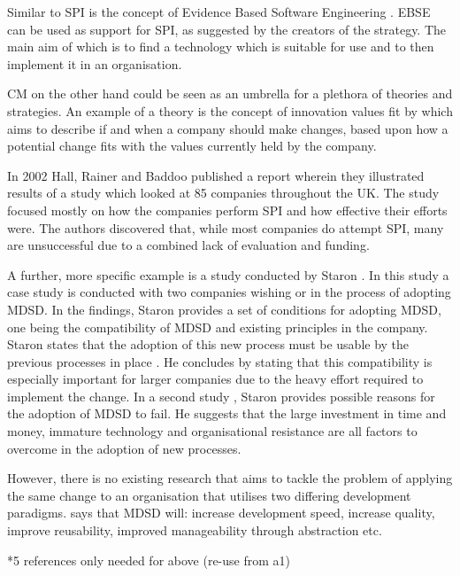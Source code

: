 \documentclass[10pt,twocolumn]{article}
\begin{document}
Similar to SPI is the concept of Evidence Based Software Engineering \cite{dyba2005evidence}. EBSE can be used as support for SPI, as suggested by the creators of the strategy. The main aim of which is to find a technology which is suitable for use and to then implement it in an organisation.

CM on the other hand could be seen as an umbrella for a plethora of theories and strategies. An example of a theory is the concept of innovation values fit by \cite{klein1996challenge} which aims to describe if and when a company should make changes, based upon how a potential change fits with the values currently held by the company.

In 2002 Hall, Rainer and Baddoo \cite{hall2002implementing} published a report wherein they illustrated results of a study which looked at 85 companies throughout the UK. The study focused mostly on how the companies perform SPI and how effective their efforts were. The authors discovered that, while most companies do attempt SPI, many are unsuccessful due to a combined lack of evaluation and funding.

A further, more specific example is a study conducted by Staron \cite{staron2006adopting}. In this study a case study is conducted with two companies wishing or in the process of adopting MDSD. In the findings, Staron provides a set of conditions for adopting MDSD, one being the compatibility of MDSD and existing principles in the company. Staron states that the adoption of this new process must be usable by the previous processes in place \cite{staron2006adopting}. He concludes by stating that this compatibility is especially important for larger companies due to the heavy effort required to implement the change. In a second study \cite{staron2008transitioning}, Staron provides possible reasons for the adoption of MDSD to fail. He suggests that the large investment in time and money, immature technology and organisational resistance are all factors to overcome in the adoption of new processes.

However, there is no existing research that aims to tackle the problem of applying the same change to an organisation that utilises two differing development paradigms. 
\cite{volter2013model} says that MDSD will: increase development speed, increase quality, improve reusability, improved manageability through abstraction etc. 


*5 references only needed for above (re-use from a1)
\end{document}
